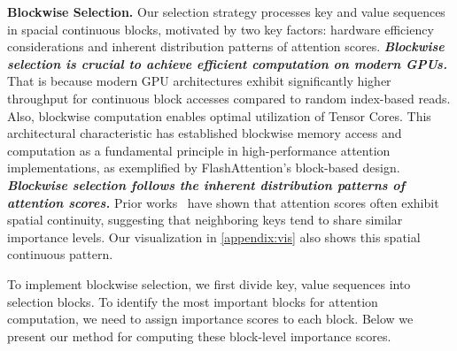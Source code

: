 \textbf{Blockwise Selection.} 
Our selection strategy processes key and value sequences in spacial continuous blocks, motivated by two key factors: hardware efficiency considerations and inherent distribution patterns of attention scores. \textit{\textbf{Blockwise selection is crucial to achieve efficient computation on modern GPUs.}} That is because modern GPU architectures exhibit significantly higher throughput for continuous block accesses compared to random index-based reads. Also, blockwise computation enables optimal utilization of Tensor Cores. This architectural characteristic has established blockwise memory access and computation as a fundamental principle in high-performance attention implementations, as exemplified by FlashAttention's block-based design. \textit{\textbf{Blockwise selection follows the inherent distribution patterns of attention scores.}} Prior works~\citep{minference} have shown that attention scores often exhibit spatial continuity, suggesting that neighboring keys tend to share similar importance levels. Our visualization in \cref{appendix:vis} also shows this spatial continuous pattern.

To implement blockwise selection, we first divide key, value sequences into selection blocks. To identify the most important blocks for attention computation, we need to assign importance scores to each block. Below we present our method for computing these block-level importance scores.





